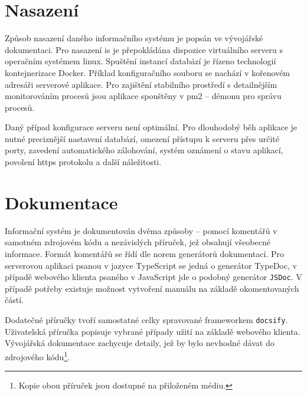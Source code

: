 

\section{Nasazení}

Způsob nasazení daného informačního systému je popsán ve vývojářské dokumentaci. Pro nasazení \gls{is} je přepokládána dispozice virtuálního serveru s operačním systémem linux. Spuštění instancí databází je řízeno technologií kontejnerizace Docker. Příklad konfiguračního souboru se nachází v kořenovém adresáři serverové aplikace. Pro zajištění stabilního prostředí s detailnějším monitorováním procesů jsou aplikace spouštěny v pm2 -- démonu pro správu procesů.

Daný případ konfigurace serveru není optimální. Pro dlouhodobý běh aplikace je nutné preciznější nastavení databází, omezení přístupu k serveru přes určité porty, zavedení automatického zálohování, systém oznámení o stavu aplikací, povolení \gls{https} protokolu a další náležitosti.




\section{Dokumentace}

Informační systém je dokumentován dvěma způsoby -- pomocí komentářů v samotném zdrojovém kódu a nezávislých příruček, jež obsahují všeobecné informace. Formát komentářů se řídí dle norem generátorů dokumentací. Pro serverovou aplikaci psanou v jazyce TypeScript se jedná o generátor TypeDoc, v případě webového klienta psaného v JavaScript jde o podobný generátor \texttt{JSDoc}. V případě potřeby existuje možnost vytvoření manuálu na základě okomentovaných částí.

Dodatečné příručky tvoří samostatné celky spravované frameworkem \texttt{docsify}. Uživatelská příručka popisuje vybrané případy užití na základě webového klienta. Vývojářská dokumentace zachycuje detaily, jež by bylo nevhodné dávat do zdrojového kódu\footnote{Kopie obou příruček jsou dostupné na přiloženém médiu.}.

